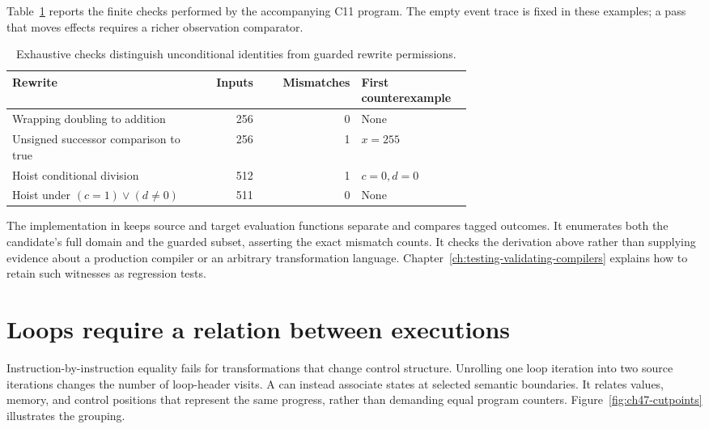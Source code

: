 Table~\ref{tab:ch47-finite-results} reports the finite checks performed by the accompanying C11 program.
The empty event trace is fixed in these examples; a pass that moves effects requires a richer observation comparator.

\begin{table}[htbp]
\centering
\caption{Exhaustive checks distinguish unconditional identities from guarded rewrite permissions.}
\label{tab:ch47-finite-results}
\begin{tabular}{p{0.42\linewidth}rrp{0.24\linewidth}}
\toprule
Rewrite & Inputs & Mismatches & First counterexample \\
\midrule
Wrapping doubling to addition & 256 & 0 & None \\
Unsigned successor comparison to true & 256 & 1 & $x=255$ \\
Hoist conditional division & 512 & 1 & $c=0,d=0$ \\
Hoist under $(c=1)\lor(d\neq0)$ & 511 & 0 & None \\
\bottomrule
\end{tabular}
\end{table}

The implementation in  keeps source and target evaluation functions separate and compares tagged outcomes.
It enumerates both the candidate's full domain and the guarded subset, asserting the exact mismatch counts.
It checks the derivation above rather than supplying evidence about a production compiler or an arbitrary transformation language.
Chapter~\ref{ch:testing-validating-compilers} explains how to retain such witnesses as regression tests.

\section{Loops require a relation between executions}
\label{sec:ch47-simulation}

Instruction-by-instruction equality fails for transformations that change control structure.
Unrolling one loop iteration into two source iterations changes the number of loop-header visits.
A  can instead associate states at selected semantic boundaries.
It relates values, memory, and control positions that represent the same progress, rather than demanding equal program counters.
Figure~\ref{fig:ch47-cutpoints} illustrates the grouping.



